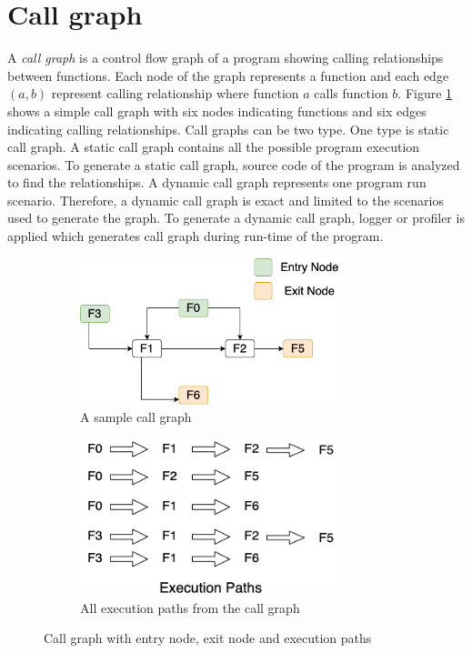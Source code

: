 
\label{chapter:background}
\section{Call graph}
A \emph{call graph} is a control flow graph of a program showing calling relationships between functions. Each node of the graph represents a function and each edge $(a, b)$ represent calling relationship where function $a$ calls function $b$. Figure \ref{fig:bg_call_graph} shows a simple call graph with six nodes indicating functions and six edges indicating calling relationships. Call graphs can be two type. One type is static call graph. A static call graph contains all the possible program execution scenarios. To generate a static call graph, source code of the program is analyzed to find the relationships. A dynamic call graph represents one program run scenario. Therefore, a dynamic call graph is exact and limited to the scenarios used to generate the graph. To generate a dynamic call graph, logger or profiler is applied which generates call graph during run-time of the program.

\begin{figure}[h]	
	\centering
	\begin{subfigure}[h]{3in}
	\includegraphics[width=3in]{figures/background/call graph.png}
	\caption{A sample call graph}\label{fig:bg_call_graph}		
	\end{subfigure}
	\quad
	\begin{subfigure}[h]{3in}
		\includegraphics[width=3in]{figures/background/execution_paths.png}
		\caption{All execution paths from the call graph}\label{fig:bg_execution_path}
	\end{subfigure}
	\caption{Call graph with entry node, exit node and execution paths}\label{fig:1}
\end{figure}

